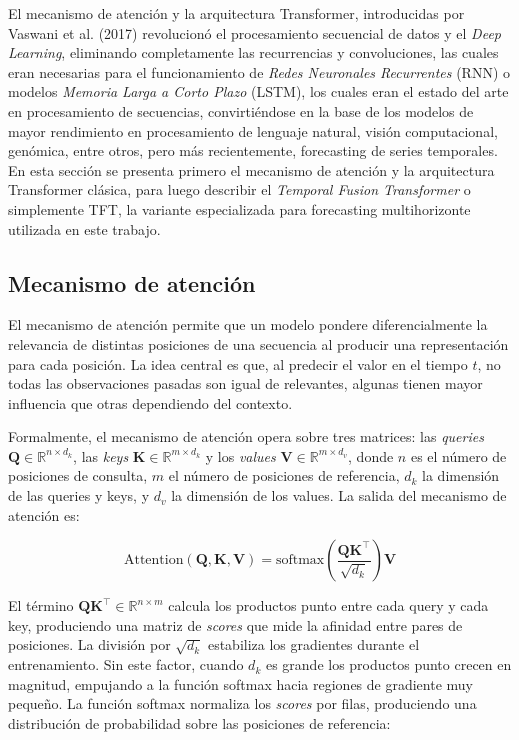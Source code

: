 El mecanismo de atención y la arquitectura Transformer, introducidas por Vaswani et al. (2017) \cite{Vaswani2017Attention} revolucionó el procesamiento secuencial de datos y el \textit{Deep Learning}, eliminando completamente las recurrencias y convoluciones, las cuales eran necesarias para el funcionamiento de \textit{Redes Neuronales Recurrentes} (RNN) o modelos \textit{Memoria Larga a Corto Plazo} (LSTM), los cuales eran el estado del arte en procesamiento de secuencias, convirtiéndose en la base de los modelos de mayor rendimiento en procesamiento de lenguaje natural, visión computacional, genómica, entre otros, pero más recientemente, forecasting de series temporales. En esta sección se presenta primero el mecanismo de atención y la arquitectura Transformer clásica, para luego describir el \textit{Temporal Fusion Transformer} o simplemente TFT, la variante especializada para forecasting multihorizonte utilizada en este trabajo.

\subsection{Mecanismo de atención}

El mecanismo de atención permite que un modelo pondere diferencialmente la relevancia de distintas posiciones de una secuencia al producir una representación para cada posición. La idea central es que, al predecir el valor en el tiempo $t$, no todas las observaciones pasadas son igual de relevantes, algunas tienen mayor influencia que otras dependiendo del contexto.

Formalmente, el mecanismo de atención opera sobre tres matrices: las \textit{queries} $\mathbf{Q} \in \mathbb{R}^{n \times d_k}$, las \textit{keys} $\mathbf{K} \in \mathbb{R}^{m \times d_k}$ y los \textit{values} $\mathbf{V} \in \mathbb{R}^{m \times d_v}$, donde $n$ es el número de posiciones de consulta, $m$ el número de posiciones de referencia, $d_k$ la dimensión de las queries y keys, y $d_v$ la dimensión de los values. La salida del mecanismo de atención es:

\begin{equation}
\text{Attention}(\mathbf{Q}, \mathbf{K}, \mathbf{V}) = \text{softmax}\left(\frac{\mathbf{Q}\mathbf{K}^\top}{\sqrt{d_k}}\right)\mathbf{V}
\end{equation}

El término $\mathbf{Q}\mathbf{K}^\top \in \mathbb{R}^{n \times m}$ calcula los productos punto entre cada query y cada key, produciendo una matriz de \textit{scores} que mide la afinidad entre pares de posiciones. La división por $\sqrt{d_k}$ estabiliza los gradientes durante el entrenamiento. Sin este factor, cuando $d_k$ es grande los productos punto crecen en magnitud, empujando a la función softmax hacia regiones de gradiente muy pequeño. La función softmax normaliza los \textit{scores} por filas, produciendo una distribución de probabilidad sobre las posiciones de referencia:

